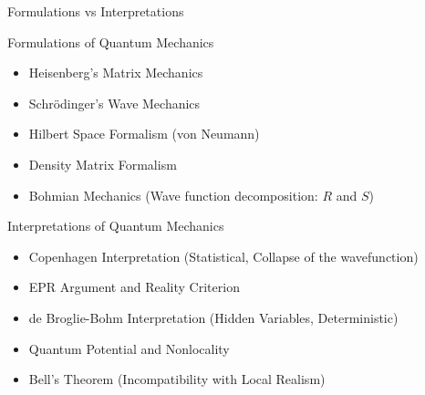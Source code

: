 \begin{frame}{Formulations vs Interpretations}

  \begin{minipage}[t]{0.43\textwidth} %
    \begin{block}{Formulations of Quantum Mechanics}
      \vspace{0.2cm}
      \begin{itemize}
        \item Heisenberg's Matrix Mechanics
        \item Schrödinger's Wave Mechanics
        \item Hilbert Space Formalism (von Neumann)
        \item Density Matrix Formalism
        \item Bohmian Mechanics (Wave function decomposition: $R$ and $S$)
      \end{itemize}
    \end{block}
  \end{minipage}
  \hfill
  \pause
  \begin{minipage}[t]{0.53\textwidth} %
    \begin{block}{Interpretations of Quantum Mechanics}
    \vspace{0.2cm}
      \begin{itemize}
        \item Copenhagen Interpretation (Statistical, Collapse of the wavefunction)
        \item EPR Argument and Reality Criterion
        \item de Broglie-Bohm Interpretation (Hidden Variables, Deterministic)
        \item Quantum Potential and Nonlocality
        \item Bell's Theorem (Incompatibility with Local Realism)
      \end{itemize}
    \end{block}
  \end{minipage}

\end{frame}


